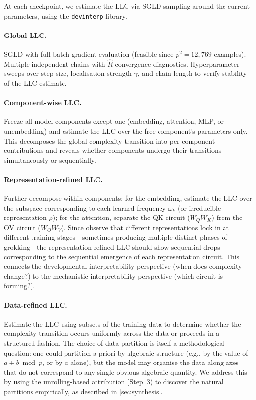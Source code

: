 \documentclass[11pt,a4paper]{article}
\begin{document}
At each checkpoint, we estimate the LLC via SGLD sampling around the current parameters, using the \texttt{devinterp} library.

\paragraph{Global LLC.} SGLD with full-batch gradient evaluation (feasible since $p^2 = 12{,}769$ examples). Multiple independent chains with $\hat{R}$ convergence diagnostics. Hyperparameter sweeps over step size, localisation strength $\gamma$, and chain length to verify stability of the LLC estimate.

\paragraph{Component-wise LLC.} Freeze all model components except one (embedding, attention, MLP, or unembedding) and estimate the LLC over the free component's parameters only. This decomposes the global complexity transition into per-component contributions and reveals whether components undergo their transitions simultaneously or sequentially.

\paragraph{Representation-refined LLC.} Further decompose within components: for the embedding, estimate the LLC over the subspace corresponding to each learned frequency $\omega_k$ (or irreducible representation $\rho$); for the attention, separate the QK circuit ($W_Q^\top W_K$) from the OV circuit ($W_O W_V$). Since \citet{chughtai2023toy} observe that different representations lock in at different training stages---sometimes producing multiple distinct phases of grokking---the representation-refined LLC should show sequential drops corresponding to the sequential emergence of each representation circuit. This connects the developmental interpretability perspective (when does complexity change?) to the mechanistic interpretability perspective (which circuit is forming?).

\paragraph{Data-refined LLC.} Estimate the LLC using subsets of the training data to determine whether the complexity transition occurs uniformly across the data or proceeds in a structured fashion. The choice of data partition is itself a methodological question: one could partition a priori by algebraic structure (e.g., by the value of $a + b \bmod p$, or by $a$ alone), but the model may organise the data along axes that do not correspond to any single obvious algebraic quantity. We address this by using the unrolling-based attribution (Step~3) to discover the natural partitions empirically, as described in \cref{sec:synthesis}.
\end{document}
